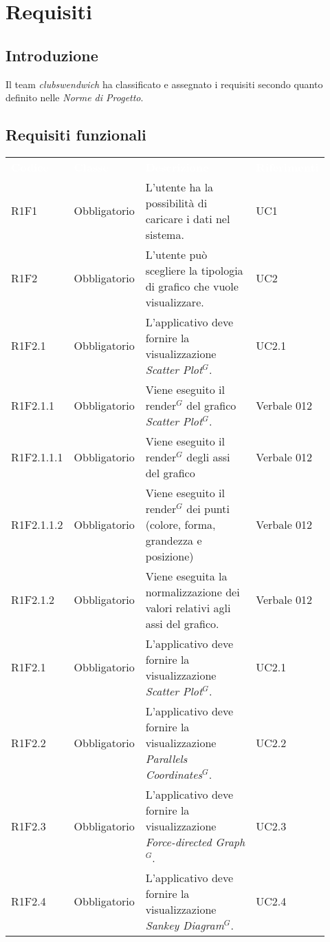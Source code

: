 \section{Requisiti}
\subsection{Introduzione}
Il team \textit{clubswendwich} ha classificato e assegnato i requisiti secondo quanto definito nelle \textit{Norme di Progetto}.
\subsection{Requisiti funzionali}
{\renewcommand{\arraystretch}{1.5}
\begin{longtable}{p{0.12\linewidth}p{0.15\linewidth}p{0.50\linewidth}p{0.15\linewidth}}
	\rowcolor[RGB]{33, 73, 50}
	\textcolor{white}{\textbf{Codice}} & \textcolor{white}{\textbf{Classe}} & \textcolor{white}{\textbf{Descrizione}} &
    \textcolor{white}{\textbf{Riferimenti}}\\
    \rowcolor[RGB]{216, 235, 171}
    R1F1 & Obbligatorio & L'utente ha la possibilità di caricare i dati nel sistema. & UC1\\
    
    \rowcolor[RGB]{233, 245, 206}
    R1F2 & Obbligatorio & L'utente può scegliere la tipologia di grafico che vuole visualizzare. & UC2\\
    \rowcolor[RGB]{233, 245, 206}
    R1F2.1 & Obbligatorio & L'applicativo deve fornire la visualizzazione \textit{Scatter Plot$^{G}$}. & UC2.1\\
    \rowcolor[RGB]{216, 235, 171}
    R1F2.1.1 & Obbligatorio & Viene eseguito il render$^{G}$ del grafico \textit{Scatter Plot$^{G}$}. & Verbale 012\\
    \rowcolor[RGB]{233, 245, 206}
    R1F2.1.1.1 & Obbligatorio & Viene eseguito il render$^{G}$ degli assi del grafico & Verbale 012\\
    \rowcolor[RGB]{216, 235, 171}
    R1F2.1.1.2 & Obbligatorio & Viene eseguito il render$^{G}$ dei punti (colore, forma, grandezza e posizione)& Verbale 012\\
    \rowcolor[RGB]{233, 245, 206}
    R1F2.1.2 & Obbligatorio & Viene eseguita la normalizzazione dei valori relativi agli assi del grafico. & Verbale 012\\
    \rowcolor[RGB]{216, 235, 171}
    R1F2.1 & Obbligatorio & L'applicativo deve fornire la visualizzazione \textit{Scatter Plot$^{G}$}. & UC2.1\\
    \rowcolor[RGB]{233, 245, 206}
    R1F2.2 & Obbligatorio & L'applicativo deve fornire la visualizzazione \textit{Parallels Coordinates$^{G}$}. & UC2.2\\
    \rowcolor[RGB]{216, 235, 171}
    R1F2.3 & Obbligatorio & L'applicativo deve fornire la visualizzazione \textit{Force-directed Graph$^{G}$}. & UC2.3\\
    \rowcolor[RGB]{233, 245, 206}
    R1F2.4 & Obbligatorio & L'applicativo deve fornire la visualizzazione \textit{Sankey Diagram$^{G}$}. & UC2.4\\
    

\end{longtable}}
